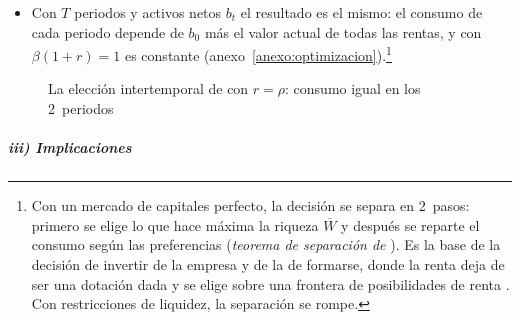 \documentclass[11pt]{article}
\begin{document}
\begin{itemize}
  el consumo se iguala en el tiempo aunque la renta no lo haga, y su nivel depende de la riqueza $\overline{W}$, no de la renta de cada periodo.\footnote{Es el \emph{alisamiento del consumo} (\emph{consumption smoothing}). Con $r\neq\rho$ la senda deja de ser plana, pero se mantienen sus rasgos: \emph{i}) la tasa de crecimiento del consumo solo cambia si cambian el tipo de interés o la tasa de descuento (\ref{sec:salidas}); \emph{ii}) con un mercado de capitales perfecto no depende de cómo se reparta la renta en el tiempo, y \emph{iii}) el nivel del consumo depende de la riqueza total del agente, sus activos más el valor actual de sus rentas futuras, y no de la renta del periodo. Con muchos periodos y una renta en forma de joroba, la senda de consumo no copia la de la renta: es suave, crece si $r>\rho$, es plana si $r=\rho$ y decrece si $r<\rho$, y la diferencia con la renta es el ahorro, negativo al principio y al final de la vida y positivo en la madurez. Es la idea que desarrollan la renta permanente y el ciclo vital .}
\item Con $T$ periodos y activos netos $b_t$ el resultado es el mismo: el consumo de cada periodo depende de $b_0$ más el valor actual de todas las rentas, y con $\beta(1+r)=1$ es constante (anexo~\ref{anexo:optimizacion}).\footnote{Con un mercado de capitales perfecto, la decisión se separa en 2~pasos: primero se elige lo que hace máxima la riqueza $\overline{W}$ y después se reparte el consumo según las preferencias (\emph{teorema de separación de} )\nocite{Fisher1930Theory,Hirshleifer1958Optimal}. Es la base de la decisión de invertir de la empresa  y de la de formarse, donde la renta deja de ser una dotación dada y se elige sobre una frontera de posibilidades de renta . Con restricciones de liquidez, la separación se rompe.}
\end{itemize}

\begin{figure}[H]
\centering
\caption{La elección intertemporal de  con $r=\rho$: consumo igual en los 2~periodos}\label{fig:fisher}
\end{figure}

\subparagraph{iii) Implicaciones}
\end{document}
